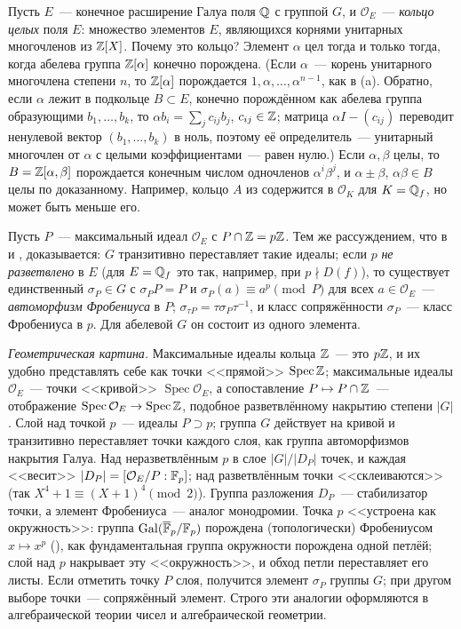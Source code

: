 \begin{aside}
Пусть $E$~--- конечное расширение Галуа поля $\mathbb Q$ с группой $G$, и $\mathcal O_E$~--- \emph{кольцо целых} поля $E$:
множество элементов $E$, являющихся корнями унитарных многочленов из $\mathbb Z[X]$. Почему это кольцо? Элемент $\alpha$ цел
тогда и только тогда, когда абелева группа $\mathbb Z[\alpha]$ конечно порождена. (Если $\alpha$~--- корень унитарного
многочлена степени $n$, то $\mathbb Z[\alpha]$ порождается $1,\alpha,\dots,\alpha^{n-1}$, как в (a). Обратно, если $\alpha$
лежит в подкольце $B\subset E$, конечно порождённом как абелева группа образующими $b_1,\dots,b_k$, то
$\alpha b_i=\sum_jc_{ij}b_j$, $c_{ij}\in\mathbb Z$; матрица $\alpha I-(c_{ij})$ переводит ненулевой вектор $(b_1,\dots,b_k)$ в ноль,
поэтому её определитель~--- унитарный многочлен от $\alpha$ с целыми коэффициентами~--- равен нулю.) Если $\alpha,\beta$
целы, то $B=\mathbb Z[\alpha,\beta]$ порождается конечным числом одночленов $\alpha^i\beta^j$, и $\alpha\pm\beta$, $\alpha\beta\in B$
целы по доказанному. Например, кольцо $A$ из  содержится в $\mathcal O_K$ для $K=\mathbb Q_f$, но может быть меньше его.

Пусть $P$~--- максимальный идеал $\mathcal O_E$ с $P\cap\mathbb Z=p\mathbb Z$. Тем же рассуждением, что в  и , доказывается:
$G$ транзитивно переставляет такие идеалы; если $p$ \emph{не разветвлено} в $E$ (для $E=\mathbb Q_f$ это так, например, при
$p\nmid D(f)$), то существует единственный $\sigma_P\in G$ с $\sigma_PP=P$ и $\sigma_P(a)\equiv a^p\pmod P$ для всех
$a\in\mathcal O_E$~--- \emph{автоморфизм Фробениуса} в $P$; $\sigma_{\tau P}=\tau\sigma_P\tau^{-1}$, и класс сопряжённости
$\sigma_P$~--- класс Фробениуса в $p$. Для абелевой $G$ он состоит из одного элемента.

\emph{Геометрическая картина.} Максимальные идеалы кольца $\mathbb Z$~--- это $p\mathbb Z$, и их удобно представлять себе как точки
<<прямой>> $\operatorname{Spec}\mathbb Z$; максимальные идеалы $\mathcal O_E$~--- точки <<кривой>> $\operatorname{Spec}\mathcal O_E$,
а сопоставление $P\mapsto P\cap\mathbb Z$~--- отображение $\operatorname{Spec}\mathcal O_E\to\operatorname{Spec}\mathbb Z$, подобное
разветвлённому накрытию степени $|G|$. Слой над точкой $p$~--- идеалы $P\supset p$; группа $G$ действует на кривой и
транзитивно переставляет точки каждого слоя, как группа автоморфизмов накрытия Галуа. Над неразветвлённым $p$ в слое
$|G|/|D_P|$ точек, и каждая <<весит>> $|D_P|=[\mathcal O_E/P:\mathbb F_p]$; над разветвлённым точки <<склеиваются>> (так
$X^4+1\equiv(X+1)^4\pmod 2$). Группа разложения $D_P$~--- стабилизатор точки, а элемент Фробениуса~--- аналог
монодромии. Точка $p$ <<устроена как окружность>>: группа $\operatorname{Gal}(\overline{\mathbb F}_p/\mathbb F_p)$ порождена (топологически) Фробениусом
$x\mapsto x^p$ (), как фундаментальная группа окружности порождена одной петлёй; слой над $p$ накрывает эту
<<окружность>>, и обход петли переставляет его листы. Если отметить точку $P$ слоя, получится элемент $\sigma_P$ группы
$G$; при другом выборе точки~--- сопряжённый элемент. Строго эти аналогии оформляются в алгебраической теории чисел и
алгебраической геометрии.
\end{aside}

